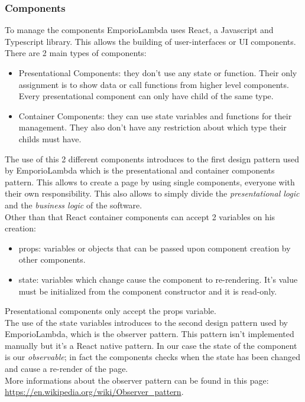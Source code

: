 \subsubsection{Components}
To manage the components EmporioLambda uses React, a Javascript and Typescript library. This allows the building of user-interfaces or UI components.
There are 2 main types of components:
\begin{itemize}
\item Presentational Components: they don't use any state or function. Their only assignment is to show data or call functions from higher level components. Every presentational component can only have child of the same type.
\item Container Components: they can use state variables and functions for their management. They also don't have any restriction about which type their childs must have.  
\end{itemize}
The use of this 2 different components introduces to the first design pattern used by EmporioLambda which is the presentational and container components pattern. This allows to create a page by using single components, everyone with their own responsibility. This also allows to simply divide the \textit{presentational logic} and the \textit{business logic} of the software.\\
Other than that React container components can accept 2 variables on his creation:
\begin{itemize}
\item props: variables or objects that can be passed upon component creation by other components.
\item state: variables which change cause the component to re-rendering. It's value must be initialized from the component constructor and it is read-only.
\end{itemize}
Presentational components only accept the props variable.\\
The use of the state variables introduces to the second design pattern used by EmporioLambda, which is the observer pattern. This pattern isn't implemented manually but it's a React native pattern. In our case the state of the component is our \textit{observable}; in fact the components checks when the state has been changed and cause a re-render of the page.\\ More informations about the observer pattern can be found in this page: \url{https://en.wikipedia.org/wiki/Observer_pattern}.\\